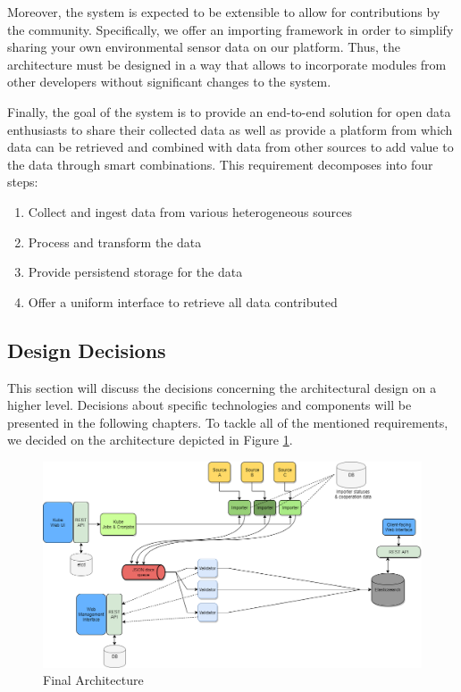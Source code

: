 Moreover, the system is expected to be extensible to allow for
contributions by the community. Specifically, we offer an importing
framework in order to simplify sharing your own environmental sensor
data on our platform. Thus, the architecture must be designed in a way
that allows to incorporate modules from other developers without
significant changes to the system.

Finally, the goal of the system is to provide an end-to-end solution for
open data enthusiasts to share their collected data as well as provide a
platform from which data can be retrieved and combined with data from other
sources to add value to the data through smart combinations.
This requirement decomposes into four steps:

\begin{enumerate}
\def\labelenumi{\arabic{enumi}.}
\tightlist
\item
  Collect and ingest data from various heterogeneous sources
\item
  Process and transform the data
\item
  Provide persistend storage for the data
\item
  Offer a uniform interface to retrieve all data contributed
\end{enumerate}

\subsection{Design Decisions}\label{design-decisions}

This section will discuss the decisions concerning the architectural
design on a higher level. Decisions about specific technologies and
components will be presented in the following chapters. To tackle all of
the mentioned requirements, we decided on the architecture depicted in
Figure \ref{fig:architecture_4}.

\begin{figure}
	\centering
		\includegraphics[width=1.00\textwidth]{images/170713_architecture4.png}
	\caption{Final Architecture}
	\label{fig:architecture_4}
\end{figure}

